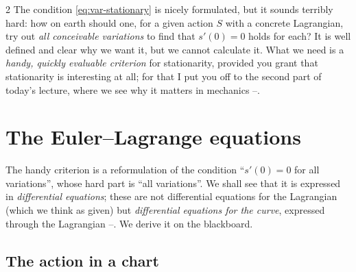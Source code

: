 \begin{paracol}{2}
The condition \eqref{eq:var-stationary} is nicely formulated, but it sounds terribly hard: how on earth should one, for a given action $S$ with a concrete Lagrangian, try out \emph{all conceivable variations} to find that $s'(0)=0$ holds for each? It is well defined and clear why we want it, but we cannot calculate it. What we need is a \emph{handy, quickly evaluable criterion} for stationarity, provided you grant that stationarity is interesting at all; for that I put you off to the second part of today's lecture, where we see why it matters in mechanics --.

\section{The Euler--Lagrange equations}\label{sec:var-el}

The handy criterion is a reformulation of the condition ``$s'(0)=0$ for all variations'', whose hard part is ``all variations''. We shall see that it is expressed in \emph{differential equations}; these are not differential equations for the Lagrangian (which we think as given) but \emph{differential equations for the curve}, expressed through the Lagrangian --. We derive it on the blackboard.

\subsection{The action in a chart}\label{ssec:var-chart}


\end{paracol}

